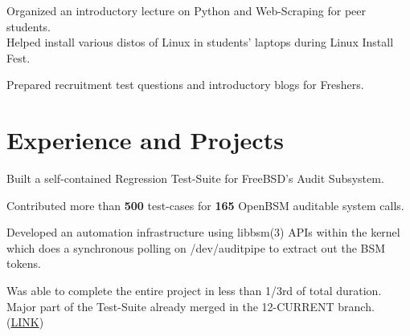 \documentclass[]{deedy-resume-openfont}
\begin{document}
\begin{minipage}[t]{0.30\textwidth}
Organized an introductory lecture on Python and Web-Scraping for peer students. \\
\vspace{0.1cm}
Helped install various distos of Linux in students' laptops during Linux Install Fest.
\vspace{0.1cm}

Prepared recruitment test questions and introductory blogs for Freshers. \\

%
%

\end{minipage} 
\hfill
\begin{minipage}[t]{0.70\textwidth} 

\vspace{-0.7cm}
\section{Experience and Projects}
\vspace{\topsep} %
\begin{tightemize}
  \item Built a self-contained Regression Test-Suite for FreeBSD's Audit Subsystem. 
  \item Contributed more than \textbf{500} test-cases for \textbf{165} OpenBSM auditable system calls.
  \item Developed an automation infrastructure using libbsm(3) APIs within the kernel which does a synchronous polling on /dev/auditpipe to extract out the BSM tokens.
  \item	Was able to complete the entire project in less than 1/3rd of total duration. Major part of the Test-Suite already merged in the 12-CURRENT branch. (\href{https://github.com/freebsd/freebsd/tree/master/tests/sys/audit}{LINK})
\end{tightemize}


\end{minipage}
\end{document}
